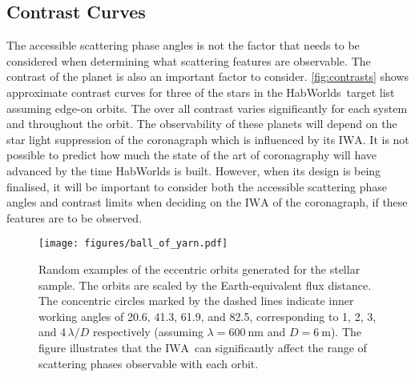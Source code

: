 \documentclass[
    usenatbib,
]{mnras}
\newcommand{\IWA}{\ensuremath{\mathrm{IWA}}}
\newcommand{\hwo}{HabWorlds}
\begin{document}

\subsection{Contrast Curves}
\label{sec:results_contrast}

The accessible scattering phase angles is not the factor that needs to be considered when determining what scattering features are observable.
%
The contrast of the planet is also an important factor to consider.
%
\cref{fig:contrasts} shows approximate contrast curves for three of the stars in the \hwo\ target list assuming edge-on orbits.
%
The over all contrast varies significantly for each system and throughout the orbit.
%
The observability of these planets will depend on the star light suppression of the coronagraph which is influenced by its \IWA{}.
%
It is not possible to predict how much the state of the art of coronagraphy will have advanced by the time \hwo{} is built.
%
However, when its design is being finalised, it will be important to consider both the accessible scattering phase angles and contrast limits when deciding on the \IWA{} of the coronagraph, if these features are to be observed.




\begin{figure*}
    \centering
    \texttt{[image: figures/ball\_of\_yarn.pdf]}  
    \caption{
        Random examples of the eccentric orbits generated for the stellar sample.
        The orbits are scaled by the Earth-equivalent flux distance. 
        The concentric circles marked by the dashed lines indicate inner working angles of 20.6, 41.3, 61.9, and \SI{82.5}{\mas}, corresponding to 1, 2, 3, and 4\,$\lambda / D$ respectively (assuming $\lambda = \SI{600}{\nano\meter}$ and $D = \SI{6}{\meter}$).
        The figure illustrates that the \IWA\ can significantly affect the range of scattering phases observable with each orbit.
    }
    \label{fig:ball-o-yarn}
\end{figure*}
 
\end{document}
